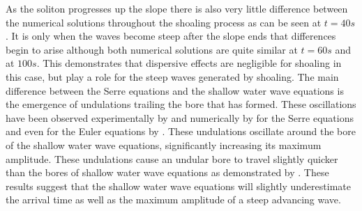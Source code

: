 \documentclass[a4paper,fleqn]{article} %
\begin{document}
As the soliton progresses up the slope there is also very little difference between the numerical solutions throughout the shoaling process as can be seen at $t=40s$. It is only when the waves become steep after the slope ends that differences begin to arise although both numerical solutions are quite similar at $t=60s$ and at $100s$. This demonstrates that dispersive effects are negligible for shoaling in this case, but play a role for the steep waves generated by shoaling. The main difference between the Serre equations and the shallow water wave equations is the emergence of undulations trailing the bore that has formed. These oscillations have been observed experimentally by \cite{Chanson-H-2009-104} and numerically by \cite{Mitsotakis-etal-2014} for the Serre equations and even for the Euler equations by \cite{Mitsotakis-etal-2017}. These undulations oscillate around the bore of the shallow water wave equations, significantly increasing its maximum amplitude. These undulations cause an undular bore to travel slightly quicker than the bores of shallow water wave equations as demonstrated by \cite{Pitt-2017}. These results suggest that the shallow water wave equations will slightly underestimate the arrival time as well as the maximum amplitude of a steep advancing wave.
%
\end{document}

